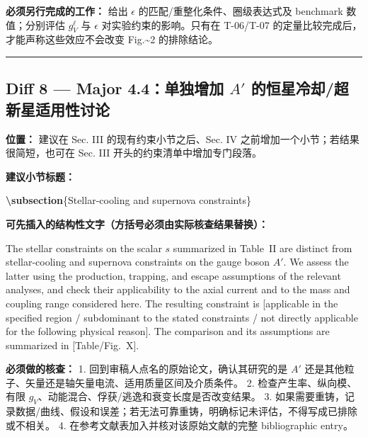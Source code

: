 \documentclass[
]{article}
\newenvironment{Shaded}{}{}
\newcommand{\KeywordTok}[1]{\textcolor[rgb]{0.00,0.44,0.13}{\textbf{#1}}}
\newcommand{\NormalTok}[1]{#1}
\begin{document}
\textbf{必须另行完成的工作：} 给出 \(\epsilon\)
的匹配/重整化条件、圈级表达式及 benchmark 数值；分别评估 \(g_V^\ell\) 与
\(\epsilon\) 对实验约束的影响。只有在 T-06/T-07
的定量比较完成后，才能声称这些效应不会改变 Fig.\textasciitilde2
的排除结论。

\begin{center}\rule{0.5\linewidth}{0.5pt}\end{center}

\subsection{\texorpdfstring{Diff 8 --- Major 4.4：单独增加 \(A'\)
的恒星冷却/超新星适用性讨论}{Diff 8 --- Major 4.4：单独增加 A\textquotesingle{} 的恒星冷却/超新星适用性讨论}}\label{diff-8-major-4.4ux5355ux72ecux589eux52a0-a-ux7684ux6052ux661fux51b7ux5374ux8d85ux65b0ux661fux9002ux7528ux6027ux8ba8ux8bba}

\textbf{位置：} 建议在 Sec. III 的现有约束小节之后、Sec. IV
之前增加一个小节；若结果很简短，也可在 Sec. III
开头的约束清单中增加专门段落。

\textbf{建议小节标题：}

\begin{Shaded}
\begin{Highlighting}[]
\KeywordTok{\textbackslash{}subsection}\NormalTok{\{Stellar{-}cooling and supernova constraints\}}
\end{Highlighting}
\end{Shaded}

\textbf{可先插入的结构性文字（方括号必须由实际核查结果替换）：}

The stellar constraints on the scalar \(s\) summarized in Table~II
are distinct from stellar-cooling and supernova constraints on the
gauge boson \(A'\). We assess the latter using the production,
trapping, and escape assumptions of the relevant analyses, and check
their applicability to the axial current and to the mass and coupling
range considered here. The resulting constraint is [applicable in
the specified region / subdominant to the stated constraints /
not directly applicable for the following physical reason].
The comparison and its assumptions are summarized in [Table/Fig.~X].

\textbf{必须做的核查：} 1. 回到审稿人点名的原始论文，确认其研究的是
\(A'\) 还是其他粒子、矢量还是轴矢量电流、适用质量区间及介质条件。 2.
检查产生率、纵向模、有限
\(g_V\)、动能混合、俘获/逃逸和衰变长度是否改变结果。 3.
如果需要重铸，记录数据/曲线、假设和误差；若无法可靠重铸，明确标记未评估，不得写成已排除或不相关。
4. 在参考文献表加入并核对该原始文献的完整 bibliographic entry。
\end{document}
